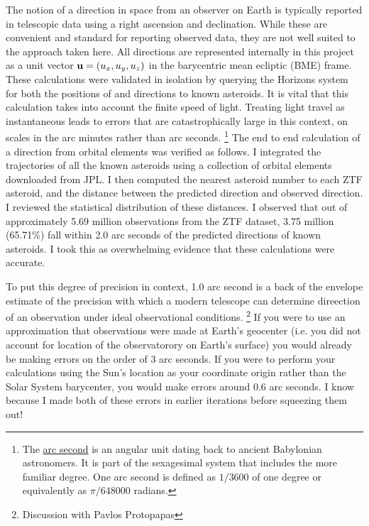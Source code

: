 The notion of a direction in space from an observer on Earth is typically reported in telescopic data using a right ascension and declination.
While these are convenient and standard for reporting observed data, they are not well suited to the approach taken here.
All directions are represented internally in this project as a unit vector $\mathbf{u} = (u_x, u_y, u_z)$ in the barycentric mean ecliptic (BME) frame.
These calculations were validated in isolation by querying the Horizons system for both the positions of and directions to known asteroids.
It is vital that this calculation takes into account the finite speed of light.
Treating light travel as instantaneous leads to errors that are catastrophically large in this context, on scales in the arc minutes rather than arc seconds.
\footnote{The \href{https://en.wikipedia.org/wiki/Minute_and_second_of_arc}{arc second}
is an angular unit dating back to ancient Babylonian astronomers.
It is part of the sexagesimal system that includes the more familiar degree.
One arc second is defined as $1 / 3600$ of one degree or equivalently as $\pi / 648000$ radians.}
The end to end calculation of a direction from orbital elements was verified as follows.
I integrated the trajectories of all the known asteroids using a collection of orbital elements downloaded from JPL.
I then computed the nearest asteroid number to each ZTF asteroid, and the distance between the predicted direction and observed direction.
I reviewed the statistical distribution of these distances.
I observed that out of approximately 5.69 million observations from the ZTF dataset,
3.75 million (65.71\%) fall within 2.0 arc seconds of the predicted directions of known asteroids.
I took this as overwhelming evidence that these calculations were accurate.

To put this degree of precision in context, 1.0 arc second is a back of the envelope estimate of the 
precision with which a modern telescope can determine direection of an observation under ideal observational conditions.
\footnote{Discussion with Pavlos Protopapas}
If you were to use an approximation that observations were made at Earth's geocenter 
(i.e. you did not account for location of the observatorory on Earth's surface) 
you would already be making errors on the order of 3 arc seconds.
If you were to perform your calculations using the Sun's location as your coordinate origin rather than the Solar System barycenter,
you would make errors around 0.6 arc seconds.
I know because I made both of these errors in earlier iterations before squeezing them out!

